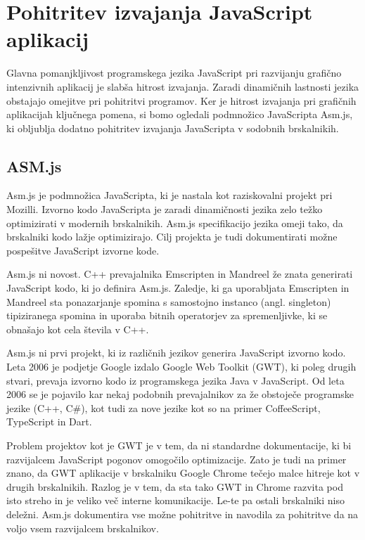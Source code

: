 \chapter{Pohitritev izvajanja JavaScript aplikacij}
\label{sec:asm}
Glavna pomanjkljivost programskega jezika JavaScript pri razvijanju grafično intenzivnih aplikacij je slabša hitrost izvajanja. Zaradi dinamičnih lastnosti jezika obstajajo omejitve pri pohitritvi programov. Ker je hitrost izvajanja pri grafičnih aplikacijah ključnega pomena, si bomo ogledali podmnožico JavaScripta Asm.js, ki obljublja dodatno pohitritev izvajanja JavaScripta v sodobnih brskalnikih.

\section{ASM.js}

Asm.js \cite{asm} je podmnožica JavaScripta, ki je nastala kot raziskovalni projekt pri Mozilli. Izvorno kodo JavaScripta je zaradi dinamičnosti jezika zelo težko optimizirati v modernih brskalnikih. Asm.js specifikacijo jezika omeji tako, da brskalniki kodo lažje optimizirajo. Cilj projekta je tudi dokumentirati možne pospešitve JavaScript izvorne kode.

Asm.js ni novost. C++ prevajalnika Emscripten in Mandreel že znata generirati JavaScript kodo, ki jo definira Asm.js. Zaledje, ki ga uporabljata Emscripten in Mandreel sta ponazarjanje spomina s samostojno instanco (angl. singleton) tipiziranega spomina in uporaba bitnih operatorjev za spremenljivke, ki se obnašajo kot cela števila v C++.

Asm.js ni prvi projekt, ki iz različnih jezikov generira JavaScript izvorno kodo. Leta 2006 je podjetje Google izdalo Google Web Toolkit (GWT), ki poleg drugih stvari, prevaja izvorno kodo iz programskega jezika Java v JavaScript. Od leta 2006 se je pojavilo kar nekaj podobnih prevajalnikov za že obstoječe programske jezike (C++, C\#), kot tudi za nove jezike kot so na primer CoffeeScript, TypeScript in Dart.

Problem projektov kot je GWT je v tem, da ni standardne dokumentacije, ki bi razvijalcem JavaScript pogonov omogočilo optimizacije. Zato je tudi na primer znano, da GWT aplikacije v brskalniku Google Chrome tečejo malce hitreje kot v drugih brskalnikih. Razlog je v tem, da sta tako GWT in Chrome razvita pod isto streho in je veliko več interne komunikacije. Le-te pa ostali brskalniki niso deležni. Asm.js dokumentira vse možne pohitritve in navodila za pohitritve da na voljo vsem razvijalcem brskalnikov.

